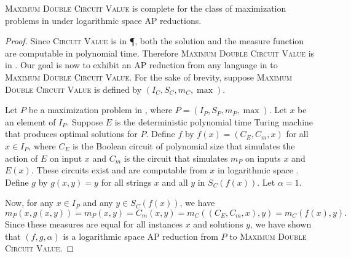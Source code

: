 \documentclass[]{article}
\begin{document}
\begin{theorem}
  \textsc{Maximum Double Circuit Value} is complete for the class of maximization problems in \PO{} under logarithmic space AP reductions.
\end{theorem}
\begin{proof}
  Since \textsc{Circuit Value} is in \P, both the solution and the measure function are computable in polynomial time.
  Therefore \textsc{Maximum Double Circuit Value} is in \PO.
  Our goal is now to exhibit an AP reduction from any language in \PO{} to \textsc{Maximum Double Circuit Value}.
  For the sake of brevity, suppose \textsc{Maximum Double Circuit Value} is defined by $(I_C, S_C, m_C, \max)$.

  Let $P$ be a maximization problem in \PO, where $P = (I_P, S_P, m_P, \max)$.
  Let $x$ be an element of $I_P$.
  Suppose $E$ is the deterministic polynomial time Turing machine that produces optimal solutions for $P$.
  Define $f$ by $f(x) = (C_E, C_m, x)$ for all $x \in I_P$, where $C_E$ is the Boolean circuit of polynomial size that simulates the action of $E$ on input $x$ and $C_m$ is the circuit that simulates $m_P$ on inputs $x$ and $E(x)$.
  These circuits exist and are computable from $x$ in logarithmic space \cite{ladner75}.
  Define $g$ by $g(x, y) = y$ for all strings $x$ and all $y$ in $S_C(f(x))$.
  Let $\alpha = 1$.

  Now, for any $x \in I_P$ and any $y \in S_C(f(x))$, we have
  \begin{equation*}
    m_P(x, g(x, y)) = m_P(x, y) = C_m(x, y) = m_C((C_E, C_m, x), y) = m_C(f(x), y).
  \end{equation*}
  Since these measures are equal for all instances $x$ and solutions $y$, we have shown that $(f, g, \alpha)$ is a logarithmic space AP reduction from $P$ to \textsc{Maximum Double Circuit Value}.
\end{proof}
\end{document}
